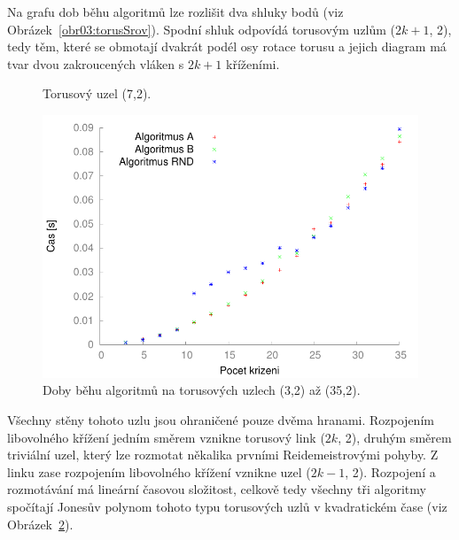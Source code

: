 Na grafu dob běhu algoritmů lze rozlišit dva shluky bodů (viz Obrázek~\ref{obr03:torusSrov}). Spodní shluk odpovídá torusovým uzlům ($2k+1$, 2), tedy těm, které se obmotají dvakrát podél osy rotace torusu a jejich diagram má tvar dvou zakroucených vláken s $2k+1$ kříženími.

\begin{figure}[h]\centering
{}
\caption{Torusový uzel (7,2).}
\label{obr03:torus7}
\end{figure}

\begin{figure}[p]\centering
\includegraphics{../img/torus2}
\caption{Doby běhu algoritmů na torusových uzlech (3,2) až (35,2).}
\label{obr03:torus2}
\end{figure}

Všechny stěny tohoto uzlu jsou ohraničené pouze dvěma hranami. Rozpojením libovolného křížení jedním směrem vznikne torusový link ($2k$, 2), druhým směrem triviální uzel, který lze rozmotat někalika prvními Reidemeistrovými pohyby. Z linku zase rozpojením libovolného křížení vznikne uzel ($2k-1$, 2). Rozpojení a rozmotávání má lineární časovou složitost, celkově tedy všechny tři algoritmy spočítají Jonesův polynom tohoto typu torusových uzlů v kvadratickém čase (viz Obrázek~\ref{obr03:torus2}).

